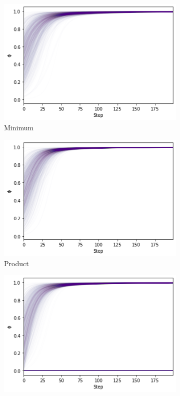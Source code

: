 \begin{figure}[h]
    \centering
    \begin{subfigure}[b]{0.45\textwidth}
        \centering
        \includegraphics[width=\textwidth]{imgs/toyconv_min.png}
        \caption{Minimum}
        \label{fig:toymin}
    \end{subfigure}
    \begin{subfigure}[b]{0.45\textwidth}
        \centering
        \includegraphics[width=\textwidth]{imgs/toyconv_prod.png}
        \caption{Product}
        \label{fig:toyprod}
    \end{subfigure}
    \begin{subfigure}[b]{0.45\textwidth}
        \centering
        \includegraphics[width=\textwidth]{imgs/toyconv_luk.png}

\end{subfigure}
\end{figure}
